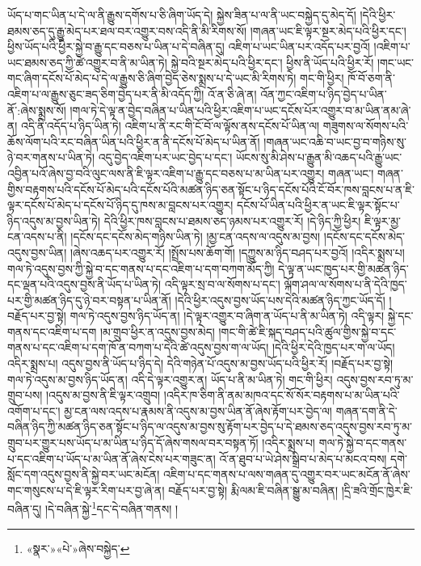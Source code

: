 ཡོད་པ་གང་ཡིན་པ་དེ་ལ་ནི་རྒྱུས་དགོས་པ་ཅི་ཞིག་ཡོད་དེ། སྐྱེས་ཟིན་པ་ལ་ནི་ཡང་བསྐྱེད་དུ་མེད་དོ། །དེའི་ཕྱིར་ཐམས་ཅད་དུ་རྒྱུ་མེད་པར་ཐལ་བར་འགྱུར་བས་འདི་ནི་མི་རིགས་སོ། །གཞན་ཡང་ཇི་ལྟར་སྔར་མེད་པའི་ཕྱིར་དང་། ཕྱིས་ཡོད་པའི་ཕྱིར་སྐྱེ་བ་རྒྱུ་དང་བཅས་པ་ཡིན་པ་དེ་བཞིན་དུ། འཇིག་པ་ཡང་ཡིན་པར་འདོད་པར་བྱའོ། །འཇིག་པ་ཡང་ཐམས་ཅད་ཀྱི་ཚེ་འགྱུར་བ་ནི་མ་ཡིན་ཏེ། སྐྱེ་བའི་སྔར་མེད་པའི་ཕྱིར་དང་། ཕྱིས་ནི་ཡོད་པའི་ཕྱིར་རོ། །གང་ཡང་གང་ཞིག་དངོས་པོ་མེད་པ་དེ་ལ་རྒྱུས་ཅི་ཞིག་བྱེད་ཅེས་སྨྲས་པ་དེ་ཡང་མི་རིགས་ཏེ། གང་གི་ཕྱིར། ཁོ་བོ་ཅག་ནི་འཇིག་པ་ལ་རྒྱུས་ཅུང་ཟད་ཅིག་བྱེད་པར་ནི་མི་འདོད་ཀྱི། འོ་ན་ཅི་ཞེ་ན། འོན་ཀྱང་འཇིག་པ་ཉིད་བྱེད་པ་ཡིན་ནོ་:ཞེས་སྨྲས་སོ། །གལ་ཏེ་དེ་ལྟ་ན་བྱེད་བཞིན་པ་ཡིན་པའི་ཕྱིར་འཇིག་པ་ཡང་དངོས་པོར་འགྱུར་བ་མ་ཡིན་ནམ་ཞེ་ན། འདི་ནི་འདོད་པ་ཉིད་ཡིན་ཏེ། འཇིག་པ་ནི་རང་གི་ངོ་བོ་ལ་ལྟོས་ནས་དངོས་པོ་ཡིན་ལ། གཟུགས་ལ་སོགས་པའི་ཆོས་ལོག་པའི་རང་བཞིན་ཡིན་པའི་ཕྱིར་ན་ནི་དངོས་པོ་མེད་པ་ཡིན་ནོ། །གཞན་ཡང་འཆི་བ་ཡང་བྱ་བ་གཉིས་སུ་ཉེ་བར་གནས་པ་ཡིན་ཏེ། འདུ་བྱེད་འཇིག་པར་ཡང་བྱེད་པ་དང་། ཡོངས་སུ་མི་ཤེས་པ་རྒྱུན་མི་འཆད་པའི་རྒྱུ་ཡང་འབྱིན་པའོ་ཞེས་བྱ་བའི་ལུང་ལས་ནི་ཇི་ལྟར་འཇིག་པ་རྒྱུ་དང་བཅས་པ་མ་ཡིན་པར་འགྱུར། གཞན་ཡང་། གཞན་གྱིས་བརྟགས་པའི་དངོས་པོ་མེད་པའི་དངོས་པོའི་མཚན་ཉིད་ཅན་སྟོང་པ་ཉིད་དངོས་པོའི་ངོ་བོར་ཁས་བླངས་པ་ན་ཇི་ལྟར་དངོས་པོ་མེད་པ་དངོས་པོ་ཉིད་དུ་ཁས་མ་བླངས་པར་འགྱུར། དངོས་པོ་ཡིན་པའི་ཕྱིར་ན་ཡང་ཇི་ལྟར་སྟོང་པ་ཉིད་འདུས་མ་བྱས་ཡིན་ཏེ། དེའི་ཕྱིར་ཁས་བླངས་པ་ཐམས་ཅད་ཉམས་པར་འགྱུར་རོ། །དེ་ཉིད་ཀྱི་ཕྱིར། ཇི་ལྟར་མྱ་ངན་འདས་པ་ནི། །དངོས་དང་དངོས་མེད་གཉིས་ཡིན་ཏེ། །མྱ་ངན་འདས་ལ་འདུས་མ་བྱས། །དངོས་དང་དངོས་མེད་འདུས་བྱས་ཡིན། །ཞེས་འཆད་པར་འགྱུར་རོ། །སྤྲོས་པས་ཆོག་གོ། །དཀྱུས་མ་ཉིད་བཤད་པར་བྱའོ། །འདིར་སྨྲས་པ། གལ་ཏེ་འདུས་བྱས་ཀྱི་སྐྱེ་བ་དང་གནས་པ་དང་འཇིག་པ་དག་བཀག་མོད་ཀྱི། དེ་ལྟ་ན་ཡང་ཁྱད་པར་གྱི་མཚན་ཉིད་དང་ལྡན་པའི་འདུས་བྱས་ནི་ཡོད་པ་ཡིན་ཏེ། འདི་ལྟར་སྲ་བ་ལ་སོགས་པ་དང་། ལྐོག་ཤལ་ལ་སོགས་པ་ནི་དེའི་ཁྱད་པར་གྱི་མཚན་ཉིད་དུ་ཉེ་བར་བསྟན་པ་ཡིན་ནོ། །དེའི་ཕྱིར་འདུས་བྱས་ཡོད་པས་དེའི་མཚན་ཉིད་ཀྱང་ཡོད་དོ། །བརྗོད་པར་བྱ་སྟེ། གལ་ཏེ་འདུས་བྱས་ཉིད་ཡོད་ན། །དེ་ལྟར་འགྱུར་བ་ཞིག་ན་ཡོད་པ་ནི་མ་ཡིན་ཏེ། འདི་ལྟར། སྐྱེ་དང་གནས་དང་འཇིག་པ་དག །མ་གྲུབ་ཕྱིར་ན་འདུས་བྱས་མེད། །གང་གི་ཚེ་ཇི་སྐད་བཤད་པའི་ཚུལ་གྱིས་སྐྱེ་བ་དང་གནས་པ་དང་འཇིག་པ་དག་ཁོ་ན་བཀག་པ་དེའི་ཚེ་འདུས་བྱས་ག་ལ་ཡོད། །དེའི་ཕྱིར་དེའི་ཁྱད་པར་ག་ལ་ཡོད། འདིར་སྨྲས་པ། འདུས་བྱས་ནི་ཡོད་པ་ཉིད་དེ། དེའི་གཉེན་པོ་འདུས་མ་བྱས་ཡོད་པའི་ཕྱིར་རོ། །བརྗོད་པར་བྱ་སྟེ། གལ་ཏེ་འདུས་མ་བྱས་ཉིད་ཡོད་ན། འདི་དེ་ལྟར་འགྱུར་ན། ཡོད་པ་ནི་མ་ཡིན་ཏེ། གང་གི་ཕྱིར། འདུས་བྱས་རབ་ཏུ་མ་གྲུབ་པས། །འདུས་མ་བྱས་ནི་ཇི་ལྟར་འགྲུབ། །འདིར་ཁ་ཅིག་ནི་ནམ་མཁའ་དང་སོ་སོར་བརྟགས་པ་མ་ཡིན་པའི་འགོག་པ་དང་། མྱ་ངན་ལས་འདས་པ་རྣམས་ནི་འདུས་མ་བྱས་ཡིན་ནོ་ཞེས་རྟོག་པར་བྱེད་ལ། གཞན་དག་ནི་དེ་བཞིན་ཉིད་ཀྱི་མཚན་ཉིད་ཅན་སྟོང་པ་ཉིད་ལ་འདུས་མ་བྱས་སུ་རྟོག་པར་བྱེད་པ་དེ་ཐམས་ཅད་འདུས་བྱས་རབ་ཏུ་མ་གྲུབ་པར་གྱུར་པས་ཡོད་པ་མ་ཡིན་པ་ཉིད་དོ་ཞེས་གསལ་བར་བསྟན་ཏོ། །འདིར་སྨྲས་པ། གལ་ཏེ་སྐྱེ་བ་དང་གནས་པ་དང་འཇིག་པ་ཡོད་པ་མ་ཡིན་ནོ་ཞེས་ངེས་པར་གཟུང་ན། འོ་ན་ཐུབ་པ་ཡེ་ཤེས་སྒྲིབ་པ་མེད་པ་མངའ་བས། དགེ་སློང་དག་འདུས་བྱས་ནི་སྐྱེ་བར་ཡང་མངོན། འཇིག་པ་དང་གནས་པ་ལས་གཞན་དུ་འགྱུར་བར་ཡང་མངོན་ནོ་ཞེས་གང་གསུངས་པ་དེ་ཇི་ལྟར་རིག་པར་བྱ་ཞེ་ན། བརྗོད་པར་བྱ་སྟེ། རྨི་ལམ་ཇི་བཞིན་སྒྱུ་མ་བཞིན། །དྲི་ཟའི་གྲོང་ཁྱེར་ཇི་བཞིན་དུ། །དེ་བཞིན་སྐྱེ་\footnote{«སྣར་»«པེ་»ཞེས་བསྐྱེད་}དང་དེ་བཞིན་གནས། །
